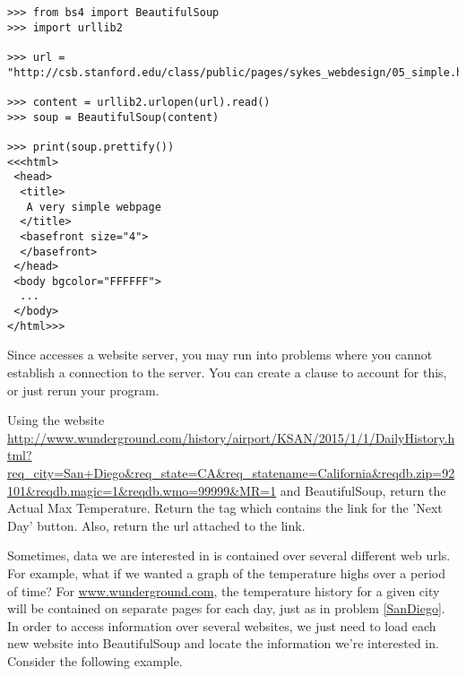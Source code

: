 \begin{lstlisting}
>>> from bs4 import BeautifulSoup
>>> import urllib2

>>> url = "http://csb.stanford.edu/class/public/pages/sykes_webdesign/05_simple.html"

>>> content = urllib2.urlopen(url).read()
>>> soup = BeautifulSoup(content)

>>> print(soup.prettify())
<<<html>
 <head>
  <title>
   A very simple webpage
  </title>
  <basefront size="4">
  </basefront>
 </head>
 <body bgcolor="FFFFFF">
  ...
 </body>
</html>>>
\end{lstlisting}

\begin{warn}
Since  accesses a website server, you may run into problems where you cannot establish a connection to the server.
You can create a  clause to account for this, or just rerun your program.
\end{warn}

\begin{problem}\label{SanDiego}

Using the website \url{http://www.wunderground.com/history/airport/KSAN/2015/1/1/DailyHistory.html?req_city=San+Diego&req_state=CA&req_statename=California&reqdb.zip=92101&reqdb.magic=1&reqdb.wmo=99999&MR=1} 
and BeautifulSoup, return the Actual Max Temperature.
Return the tag which contains the link for the 'Next Day' button.
Also, return the url attached to the link.

\end{problem}

Sometimes, data we are interested in is contained over several different web urls.
For example, what if we wanted a graph of the temperature highs over a period of time?
For \url{www.wunderground.com}, the temperature history for a given city will be contained on separate pages for each day, just as in problem \ref{SanDiego}. In order to access information over several websites, we just need to load each new website into BeautifulSoup and locate the information we're interested in. Consider the following example.

